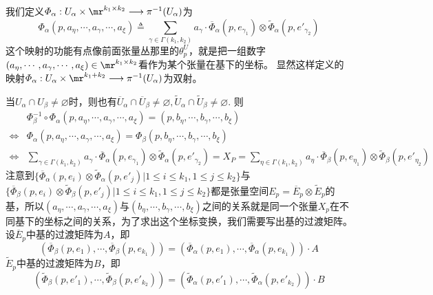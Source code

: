 我们定义$\varPhi_{\alpha}:U_{\alpha}\times \mr^{k_{1}\times k_{2}} \longrightarrow \pi^{-1}(U_{\alpha})$为
\[
\varPhi_{\alpha}(p,a_{\eta},\cdots,a_{\gamma},\cdots,a_{\xi})\triangleq  \sum_{ \gamma\in \Gamma(k_{1},k_{2}) }a_{\gamma}\cdot\overline{\varPhi}_{\alpha}(p,e_{\gamma_{ 1 }})\otimes  \tilde{\varPhi}_{\alpha}(p,e'_{\gamma_{2}})
\]
这个映射的功能有点像前面张量丛那里的$\theta^{U}_{p}$，就是把一组数字$(a_{\eta},\cdots,a_{\gamma},\cdots,a_{\xi})\in \mr^{k_{1}\times k_{2}}$看作为某个张量在基下的坐标。
显然这样定义的映射$\varPhi_{\alpha}:U_{\alpha}\times \mr^{k_{1}+k_{2}} \longrightarrow \pi^{-1}(U_{\alpha})$为双射。

当$U_{\alpha}\cap U_{\beta}\neq\varnothing$时，则也有$\overline{U}_{\alpha}\cap\overline{U}_{\beta}\neq\varnothing,\tilde{U}_{\alpha}\cap\tilde{U}_{\beta}\neq\varnothing$. 则
\[
\begin{split}
&\varPhi^{ -1}_{\beta}\circ\varPhi_{\alpha}(p,a_{\eta},\cdots,a_{\gamma},\cdots,a_{\xi})=(p,b_{\eta},\cdots,b_{\gamma},\cdots,b_{\xi})\\
\Leftrightarrow&\varPhi_{\alpha}(p,a_{\eta},\cdots,a_{\gamma},\cdots,a_{\xi})=\varPhi_{\beta}(p,b_{\eta},\cdots,b_{\gamma},\cdots,b_{\xi})\\
\Leftrightarrow&\sum_{ \gamma\in \Gamma(k_{1},k_{2}) }a_{\gamma}\cdot\overline{\varPhi}_{\alpha}(p,e_{\gamma_{ 1 }})\otimes  \tilde{\varPhi}_{\alpha}(p,e'_{\gamma_{2}})=X_{P}=\sum_{ \eta\in \Gamma(k_{1},k_{2}) }a_{\eta}\cdot\overline{\varPhi}_{\beta}(p,e_{\eta_{ 1 }})\otimes  \tilde{\varPhi}_{\beta}(p,e'_{\eta_{2}})
\end{split}
\]
注意到$\{\overline{\varPhi}_{\alpha}(p,e_{i})\otimes \tilde{\varPhi}_{\alpha}(p,e'_{j})| 1\leqslant i\leqslant k_{1},1\leqslant j\leqslant k_{2}\} $与$\{\overline{\varPhi}_{\beta}(p,e_{i})\otimes \tilde{\varPhi}_{\beta}(p,e'_{j})| 1\leqslant i\leqslant k_{1},1\leqslant j\leqslant k_{2}\} $都是张量空间$E_{p}=\overline{E}_{p}\otimes \tilde{E}_{p}$的基，所以$(a_{\eta},\cdots,a_{\gamma},\cdots,a_{\xi})$与$(b_{\eta},\cdots,b_{\gamma},\cdots,b_{\xi})$之间的关系就是同一个张量$X_{p}$在不同基下的坐标之间的关系，为了求出这个坐标变换，我们需要写出基的过渡矩阵。设$\overline{E}_{p}$中基的过渡矩阵为$A$，即
\begin{equation}
	\left(\overline{\varPhi}_{\beta}(p,e_{1}),\cdots,\overline{\varPhi}_{\beta}(p,e_{k_{1}}) \right)=\left(\overline{\varPhi}_{\alpha}(p,e_{1}),\cdots,\overline{\varPhi}_{\alpha}(p,e_{k_{1}}) \right)\cdot A
\end{equation}
$\tilde{E}_{p}$中基的过渡矩阵为$B$，即
\[
\left(\tilde{\varPhi}_{\beta}(p,e'_{1}),\cdots,\tilde{\varPhi}_{\beta}(p,e'_{k_{2}}) \right)=\left(\tilde{\varPhi}_{\alpha}(p,e'_{1}),\cdots,\tilde{\varPhi}_{\alpha}(p,e'_{k_{2}}) \right)\cdot B
\]
